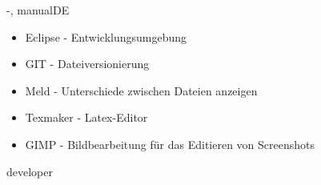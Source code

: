 \documentclass[twoside]{report}
\begin{document}
\begin{shownto}{-, manualDE}
\nsecend

\begin{itemize}
\item{Eclipse - Entwicklungsumgebung}
\item{GIT - Dateiversionierung}
\item{Meld - Unterschiede zwischen Dateien anzeigen}
\item{Texmaker - Latex-Editor}
\item{GIMP - Bildbearbeitung für das Editieren von Screenshots}
\end{itemize}
\nsecend



\nsecend %

\end{shownto} %
\begin{shownto}{developer}


\end{shownto}
\end{document}

